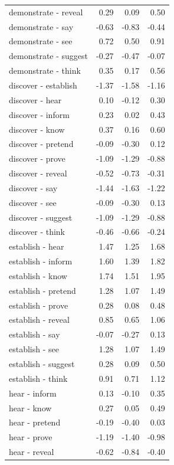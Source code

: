 \begin{longtable}{lrrr}
  demonstrate - reveal & 0.29 & 0.09 & 0.50 \\ 
  demonstrate - say & -0.63 & -0.83 & -0.44 \\ 
  demonstrate - see & 0.72 & 0.50 & 0.91 \\ 
  demonstrate - suggest & -0.27 & -0.47 & -0.07 \\ 
  demonstrate - think & 0.35 & 0.17 & 0.56 \\ 
  discover - establish & -1.37 & -1.58 & -1.16 \\ 
  discover - hear & 0.10 & -0.12 & 0.30 \\ 
  discover - inform & 0.23 & 0.02 & 0.43 \\ 
  discover - know & 0.37 & 0.16 & 0.60 \\ 
  discover - pretend & -0.09 & -0.30 & 0.12 \\ 
  discover - prove & -1.09 & -1.29 & -0.88 \\ 
  discover - reveal & -0.52 & -0.73 & -0.31 \\ 
  discover - say & -1.44 & -1.63 & -1.22 \\ 
  discover - see & -0.09 & -0.30 & 0.13 \\ 
  discover - suggest & -1.09 & -1.29 & -0.88 \\ 
  discover - think & -0.46 & -0.66 & -0.24 \\ 
  establish - hear & 1.47 & 1.25 & 1.68 \\ 
  establish - inform & 1.60 & 1.39 & 1.82 \\ 
  establish - know & 1.74 & 1.51 & 1.95 \\ 
  establish - pretend & 1.28 & 1.07 & 1.49 \\ 
  establish - prove & 0.28 & 0.08 & 0.48 \\ 
  establish - reveal & 0.85 & 0.65 & 1.06 \\ 
  establish - say & -0.07 & -0.27 & 0.13 \\ 
  establish - see & 1.28 & 1.07 & 1.49 \\ 
  establish - suggest & 0.28 & 0.09 & 0.50 \\ 
  establish - think & 0.91 & 0.71 & 1.12 \\ 
  hear - inform & 0.13 & -0.10 & 0.35 \\ 
  hear - know & 0.27 & 0.05 & 0.49 \\ 
  hear - pretend & -0.19 & -0.40 & 0.03 \\ 
  hear - prove & -1.19 & -1.40 & -0.98 \\ 
  hear - reveal & -0.62 & -0.84 & -0.40 \\ 

\end{longtable}
